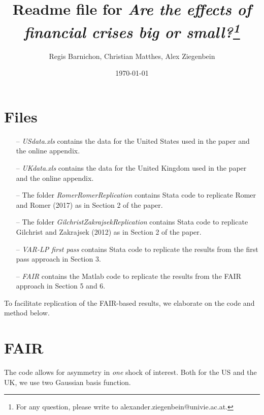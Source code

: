 \documentclass[a4paper,12pt]{article}
\begin{document}
\title{\large{Readme file for \textit{Are the effects of financial crises big or small?\footnote{For any question, please write to alexander.ziegenbein@univie.ac.at.}}}}
\author{\normalsize{Regis Barnichon}, \normalsize{Christian Matthes}, \normalsize{Alex Ziegenbein}  }
\date{\footnotesize \today}

\maketitle

\section*{Files}

\begin{enumerate}
\item[--] \textit{USdata.xls} contains the data for the United States used in the paper and the online appendix.
\item[--] \textit{UKdata.xls} contains the data for the United Kingdom used in the paper and the online appendix.
\item[--] The folder \textit{RomerRomerReplication} contains Stata code to replicate Romer and Romer (2017) as in Section 2 of the paper.
\item[--] The folder \textit{GilchristZakrajsekReplication} contains Stata code to replicate Gilchrist and Zakrajsek (2012) as in Section 2 of the paper.
\item[--] \textit{VAR-LP first pass} contains Stata code to replicate the results from the first pass approach in Section 3.
\item[--] \textit{FAIR} contains the Matlab code to replicate the results from the FAIR approach in Section 5 and 6.
\end{enumerate}

To facilitate replication of the FAIR-based results, we elaborate on the code and method below.

\section*{FAIR}

The code allows for asymmetry in \emph{one} shock of interest. Both for the US and the UK, we use two Gaussian basis function. 
\end{document}
